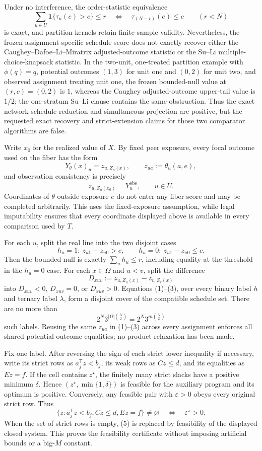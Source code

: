 Under no interference, the order-statistic equivalence
\[
\sum_{u\in U}\mathbf 1\{\tau_u(e)>c\}\leq r
\quad\Longleftrightarrow\quad
\tau_{(N-r)}(e)\leq c
\qquad(r<N)
\]
is exact, and partition kernels retain finite-sample validity.  Nevertheless, the frozen assignment-specific schedule score does not exactly recover either the Caughey--Dafoe--Li--Miratrix adjusted-outcome statistic or the Su--Li multiple-choice-knapsack statistic.  In the two-unit, one-treated partition example with \(\phi(q)=q\), potential outcomes \((1,3)\) for unit one and \((0,2)\) for unit two, and observed assignment treating unit one, the frozen bounded-null value at \((r,c)=(0,2)\) is \(1\), whereas the Caughey adjusted-outcome upper-tail value is \(1/2\); the one-stratum Su--Li clause contains the same obstruction.  Thus the exact network schedule reduction and simultaneous projection are positive, but the requested exact recovery and strict-extension claims for those two comparator algorithms are false.

Write \(x_0\) for the realized value of \(X\).  By fixed peer exposure, every focal outcome used on the fiber has the form
\[
Y_\theta(x)_u=z_{u,Z_u(x)},
\qquad z_{ua}:=\theta_u(a,e),
\]
and observation consistency is precisely
\[
z_{u,Z_u(x_0)}=Y^{\mathrm{obs}}_u,
\qquad u\in U.
\tag{1}
\]
Coordinates of \(\theta\) outside exposure \(e\) do not enter any fiber score and may be completed arbitrarily.  This uses the fixed-exposure assumption, while legal imputability ensures that every coordinate displayed above is available in every comparison used by \(T\).

For each \(u\), split the real line into the two disjoint cases
\[
h_u=1:\ z_{u1}-z_{u0}>c,
\qquad
h_u=0:\ z_{u1}-z_{u0}\leq c.
\tag{2}
\]
Then the bounded null is exactly \(\sum_u h_u\leq r\), including equality at the threshold in the \(h_u=0\) case.  For each \(x\in\Omega\) and \(u<v\), split the difference
\[
D_{xuv}:=z_{u,Z_u(x)}-z_{v,Z_v(x)}
\tag{3}
\]
into \(D_{xuv}<0\), \(D_{xuv}=0\), or \(D_{xuv}>0\).  Equations (1)--(3), over every binary label \(h\) and ternary label \(\lambda\), form a disjoint cover of the compatible schedule set.  There are no more than
\[
2^N3^{|\Omega|\binom N2}=2^N3^{m\binom N2}
\tag{4}
\]
such labels.  Reusing the same \(z_{ua}\) in (1)--(3) across every assignment enforces all shared-potential-outcome equalities; no product relaxation has been made.

Fix one label.  After reversing the sign of each strict lower inequality if necessary, write its strict rows as \(a_j^{\mathsf T}z<b_j\), its weak rows as \(Cz\leq d\), and its equalities as \(Ez=f\).  If the cell contains \(z^\star\), the finitely many strict slacks have a positive minimum \(\delta\).  Hence \((z^\star,\min\{1,\delta\})\) is feasible for the auxiliary program and its optimum is positive.  Conversely, any feasible pair with \(\varepsilon>0\) obeys every original strict row.  Thus
\[
\{z:a_j^{\mathsf T}z<b_j, Cz\leq d, Ez=f\}\neq\varnothing
\quad\Longleftrightarrow\quad
\varepsilon^\star>0.
\tag{5}
\]
When the set of strict rows is empty, (5) is replaced by feasibility of the displayed closed system.  This proves the feasibility certificate without imposing artificial bounds or a big-\(M\) constant.

